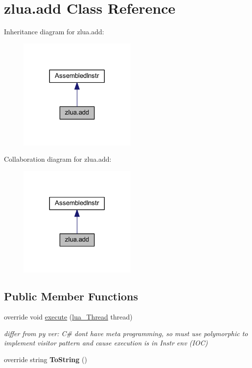 \hypertarget{classzlua_1_1add}{}\section{zlua.\+add Class Reference}
\label{classzlua_1_1add}


Inheritance diagram for zlua.\+add\+:
\nopagebreak
\begin{figure}[H]
\begin{center}
\leavevmode
\includegraphics[width=164pt]{classzlua_1_1add__inherit__graph}
\end{center}
\end{figure}


Collaboration diagram for zlua.\+add\+:
\nopagebreak
\begin{figure}[H]
\begin{center}
\leavevmode
\includegraphics[width=164pt]{classzlua_1_1add__coll__graph}
\end{center}
\end{figure}
\subsection*{Public Member Functions}
\begin{DoxyCompactItemize}
\item 
override void \mbox{\hyperlink{classzlua_1_1add_a7a1a96e612bf700e73a640d4c4080179}{execute}} (\mbox{\hyperlink{classzlua_1_1lua___thread}{lua\+\_\+\+Thread}} thread)
\begin{DoxyCompactList}\small\item\em differ from py ver\+: C\# dont have meta programming, so must use polymorphic to implement visitor pattern and cause execution is in Instr env (I\+OC) \end{DoxyCompactList}\item 
\mbox{\label{classzlua_1_1add_a85badfe9148e31edd2307a72be6d0757}} 
override string {\bfseries To\+String} ()
\end{DoxyCompactItemize}
